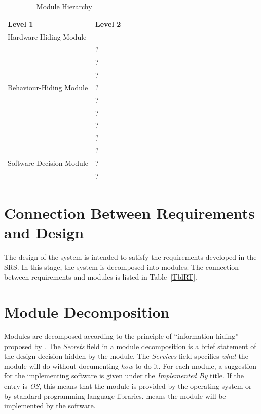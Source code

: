 \documentclass[12pt, titlepage]{article}
\begin{document}
\begin{table}[h!]
\centering
\begin{tabular}{p{} p{}}
\toprule
\textbf{Level 1} & \textbf{Level 2}\\
\midrule

{Hardware-Hiding Module} & ~ \\
\midrule

\multirow{7}{0.3\textwidth}{Behaviour-Hiding Module} & ?\\
& ?\\
& ?\\
& ?\\
& ?\\
& ?\\
& ?\\ 
& ?\\
\midrule

\multirow{3}{0.3\textwidth}{Software Decision Module} & {?}\\
& ?\\
& ?\\
\bottomrule

\end{tabular}
\caption{Module Hierarchy}
\label{TblMH}
\end{table}

\section{Connection Between Requirements and Design} \label{SecConnection}

The design of the system is intended to satisfy the requirements developed in
the SRS. In this stage, the system is decomposed into modules. The connection
between requirements and modules is listed in Table~\ref{TblRT}.

\section{Module Decomposition} \label{SecMD}

Modules are decomposed according to the principle of ``information hiding''
proposed by \citet{ParnasEtAl1984}. The \emph{Secrets} field in a module
decomposition is a brief statement of the design decision hidden by the
module. The \emph{Services} field specifies \emph{what} the module will do
without documenting \emph{how} to do it. For each module, a suggestion for the
implementing software is given under the \emph{Implemented By} title. If the
entry is \emph{OS}, this means that the module is provided by the operating
system or by standard programming language libraries.  \emph{\progname{}} means the
module will be implemented by the \progname{} software.
\end{document}
